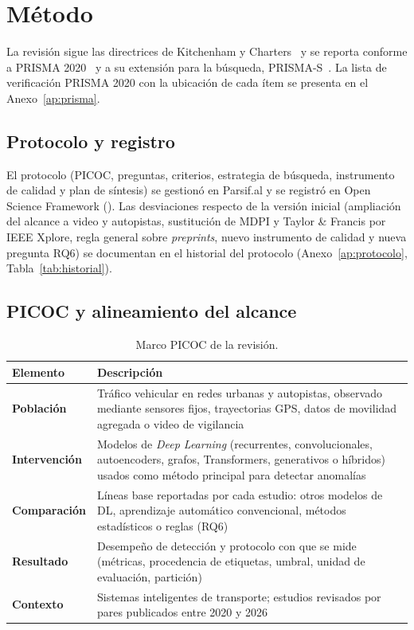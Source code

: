 \documentclass[12pt, a4paper]{article}
\begin{document}
\section{M\'{e}todo}
\label{sec:metodo}

La revisi\'{o}n sigue las directrices de Kitchenham y Charters~\cite{Kitchenham2007} y se reporta conforme a PRISMA 2020~\cite{page2021prisma} y a su extensi\'{o}n para la b\'{u}squeda, PRISMA-S~\cite{rethlefsen2021prismas}. La lista de verificaci\'{o}n PRISMA 2020 con la ubicaci\'{o}n de cada \'{i}tem se presenta en el Anexo~\ref{ap:prisma}.

\subsection{Protocolo y registro}

El protocolo (PICOC, preguntas, criterios, estrategia de b\'{u}squeda, instrumento de calidad y plan de s\'{i}ntesis) se gestion\'{o} en Parsif.al y se registr\'{o} en Open Science Framework (\RegistroOSF). Las desviaciones respecto de la versi\'{o}n inicial (ampliaci\'{o}n del alcance a video y autopistas, sustituci\'{o}n de MDPI y Taylor \& Francis por IEEE Xplore, regla general sobre \textit{preprints}, nuevo instrumento de calidad y nueva pregunta RQ6) se documentan en el historial del protocolo (Anexo~\ref{ap:protocolo}, Tabla~\ref{tab:historial}).

\subsection{PICOC y alineamiento del alcance}

\begin{table}[H]
\centering
\small
\caption{Marco PICOC de la revisi\'{o}n.}
\label{tab:picoc}
\begin{tabularx}{\linewidth}{>{\bfseries}lY}
\toprule
Elemento & Descripci\'{o}n \\
\midrule
Poblaci\'{o}n    & Tr\'{a}fico vehicular en redes urbanas y autopistas, observado mediante sensores fijos, trayectorias GPS, datos de movilidad agregada o video de vigilancia \\
Intervenci\'{o}n & Modelos de \textit{Deep Learning} (recurrentes, convolucionales, autoencoders, grafos, Transformers, generativos o h\'{i}bridos) usados como m\'{e}todo principal para detectar anomal\'{i}as \\
Comparaci\'{o}n  & L\'{i}neas base reportadas por cada estudio: otros modelos de DL, aprendizaje autom\'{a}tico convencional, m\'{e}todos estad\'{i}sticos o reglas (RQ6) \\
Resultado        & Desempe\~{n}o de detecci\'{o}n y protocolo con que se mide (m\'{e}tricas, procedencia de etiquetas, umbral, unidad de evaluaci\'{o}n, partici\'{o}n) \\
Contexto         & Sistemas inteligentes de transporte; estudios revisados por pares publicados entre 2020 y 2026 \\
\bottomrule
\end{tabularx}
\end{table}
\end{document}
